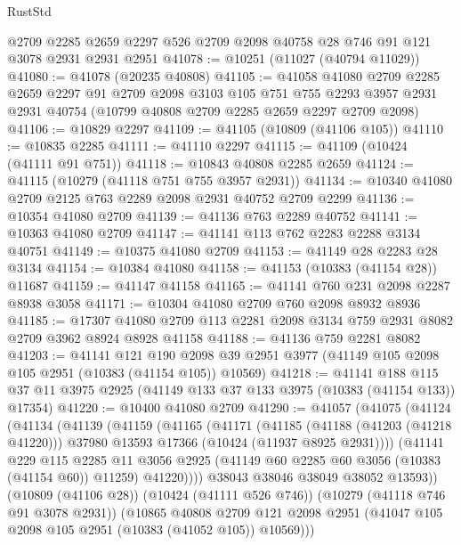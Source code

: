 \begin{lexlean}{RustStd}
\begin{coremodule}
    @2709
    @2285
    @2659
    @2297
    @526
    @2709
    @2098
    @40758
    @28
    @746
    @91
    @121
    @3078
    @2931
    @2931
    @2951
@41078 := @10251 (@11027 (@40794 @11029))
@41080 := @41078 (@20235 @40808)
@41105 := @41058
    @41080
    @2709
    @2285
    @2659
    @2297
    @91
    @2709
    @2098
    @3103
    @105
    @751
    @755
    @2293
    @3957
    @2931
    @2931
    @40754
    (@10799 @40808 @2709 @2285 @2659 @2297 @2709 @2098)
@41106 := @10829 @2297
@41109 := @41105 (@10809 (@41106 @105))
@41110 := @10835 @2285
@41111 := @41110 @2297
@41115 := @41109 (@10424 (@41111 @91 @751))
@41118 := @10843 @40808 @2285 @2659
@41124 := @41115 (@10279 (@41118 @751 @755 @3957 @2931))
@41134 := @10340 @41080 @2709 @2125 @763 @2289 @2098 @2931 @40752 @2709 @2299
@41136 := @10354 @41080 @2709
@41139 := @41136 @763 @2289 @40752
@41141 := @10363 @41080 @2709
@41147 := @41141 @113 @762 @2283 @2288 @3134 @40751
@41149 := @10375 @41080 @2709
@41153 := @41149 @28 @2283 @28 @3134
@41154 := @10384 @41080
@41158 := @41153 (@10383 (@41154 @28)) @11687
@41159 := @41147 @41158
@41165 := @41141 @760 @231 @2098 @2287 @8938 @3058
@41171 := @10304 @41080 @2709 @760 @2098 @8932 @8936
@41185 := @17307 @41080 @2709 @113 @2281 @2098 @3134 @759 @2931 @8082 @2709 @3962 @8924 @8928 @41158
@41188 := @41136 @759 @2281 @8082
@41203 := @41141
    @121
    @190
    @2098
    @39
    @2951
    @3977
    (@41149 @105 @2098 @105 @2951 (@10383 (@41154 @105)) @10569)
@41218 := @41141
    @188
    @115
    @37
    @11
    @3975
    @2925
    (@41149 @133 @37 @133 @3975 (@10383 (@41154 @133)) @17354)
@41220 := @10400 @41080 @2709
@41290 := @41057
    (@41075
      (@41124
        (@41134
          (@41139
            (@41159
              (@41165
                (@41171
                  (@41185
                    (@41188 (@41203 (@41218 @41220)))
                    @37980
                    @13593
                    @17366
                    (@10424 (@11937 @8925 @2931))))
                (@41141
                  @229
                  @115
                  @2285
                  @11
                  @3056
                  @2925
                  (@41149 @60 @2285 @60 @3056 (@10383 (@41154 @60)) @11259)
                  @41220))))
          @38043
          @38046
          @38049
          @38052
          @13593))
      (@10809 (@41106 @28))
      (@10424 (@41111 @526 @746))
      (@10279 (@41118 @746 @91 @3078 @2931))
      (@10865
        @40808
        @2709
        @121
        @2098
        @2951
        (@41047 @105 @2098 @105 @2951 (@10383 (@41052 @105)) @10569)))

\end{coremodule}
\end{lexlean}
